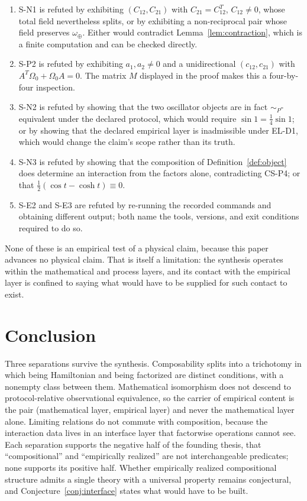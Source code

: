 \documentclass[11pt]{article}
\theoremstyle{plain}
\begin{document}
\begin{enumerate}[leftmargin=2.2em]
\item S-N1 is refuted by exhibiting $(C_{12},C_{21})$ with $C_{21}=C_{12}^{T}$,
      $C_{12}\neq0$, whose total field nevertheless splits, or by exhibiting a
      non-reciprocal pair whose field preserves $\omega_\oplus$. Either would
      contradict Lemma~\ref{lem:contraction}, which is a finite computation and
      can be checked directly.
\item S-P2 is refuted by exhibiting $a_1,a_2\neq0$ and a unidirectional
      $(c_{12},c_{21})$ with $A^{T}\Omega_0+\Omega_0A=0$. The matrix $M$
      displayed in the proof makes this a four-by-four inspection.
\item S-N2 is refuted by showing that the two oscillator objects are in fact
      $\sim_P$-equivalent under the declared protocol, which would require
      $\sin 1=\tfrac14\sin 1$; or by showing that the declared empirical layer
      is inadmissible under EL-D1, which would change the claim's scope rather
      than its truth.
\item S-N3 is refuted by showing that the composition of
      Definition~\ref{def:object} does determine an interaction from the factors
      alone, contradicting CS-P4; or that $\tfrac12(\cos t-\cosh t)\equiv0$.
\item S-E2 and S-E3 are refuted by re-running the recorded commands and
      obtaining different output; both name the tools, versions, and exit
      conditions required to do so.
\end{enumerate}

None of these is an empirical test of a physical claim, because this paper
advances no physical claim. That is itself a limitation: the synthesis operates
within the mathematical and process layers, and its contact with the empirical
layer is confined to saying what would have to be supplied for such contact to
exist.

\section{Conclusion}

Three separations survive the synthesis. Composability splits into a trichotomy
in which being Hamiltonian and being factorized are distinct conditions, with a
nonempty class between them. Mathematical isomorphism does not descend to
protocol-relative observational equivalence, so the carrier of empirical content
is the pair (mathematical layer, empirical layer) and never the mathematical
layer alone. Limiting relations do not commute with composition, because the
interaction data lives in an interface layer that factorwise operations cannot
see. Each separation supports the negative half of the founding thesis, that
``compositional'' and ``empirically realized'' are not interchangeable
predicates; none supports its positive half. Whether empirically realized
compositional structure admits a single theory with a universal property remains
conjectural, and Conjecture~\ref{conj:interface} states what would have to be
built.
\end{document}
